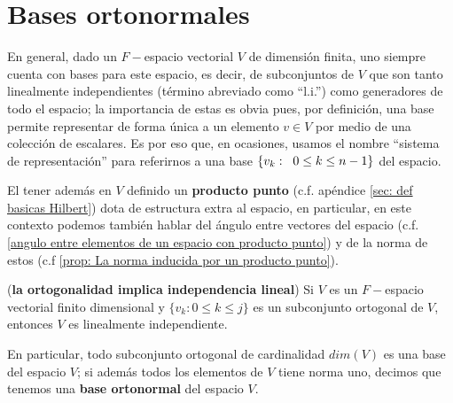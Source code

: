 \section{Bases ortonormales}


En general, dado un $F-$espacio vectorial $V$ de dimensión finita,
uno siempre cuenta con 
bases para este espacio,
es decir, de subconjuntos de $V$ que son tanto linealmente
independientes (término abreviado como ``l.i.'') como generadores
de todo el espacio; la importancia de 
estas es obvia pues, por definición, una base permite representar
de forma única a un elemento $v \in V$ por medio
de una colección de escalares. Es por eso que, en ocasiones,
usamos el nombre ``sistema de representación''
para referirnos a
una base $\{ v_{k} : \hspace{0.2cm} 0 \leq k \leq n-1 \}$
del espacio.

El tener además en $V$ definido un \textbf{producto punto}
(c.f. apéndice \ref{sec: def basicas Hilbert})
dota de estructura extra al espacio, en particular, 
en este contexto podemos también hablar del ángulo entre vectores
del espacio (c.f.
\ref{angulo entre elementos de un espacio con producto punto}) 
y de la norma de estos
(c.f \ref{prop: La norma inducida por un producto punto}).

\begin{prop}
(\textbf{la ortogonalidad implica independencia lineal})
Si $V$ es un $F-$espacio vectorial finito dimensional y 
$\{ v_{k} : 0\leq k \leq j \}$ es un subconjunto ortogonal de
$V$, entonces $V$ es linealmente independiente.
\end{prop}

En particular, todo subconjunto ortogonal de cardinalidad
$dim(V)$ es una base del espacio $V$; si además todos los elementos
de $V$ tiene norma uno, decimos que tenemos una
\textbf{base ortonormal} del espacio $V$. 


